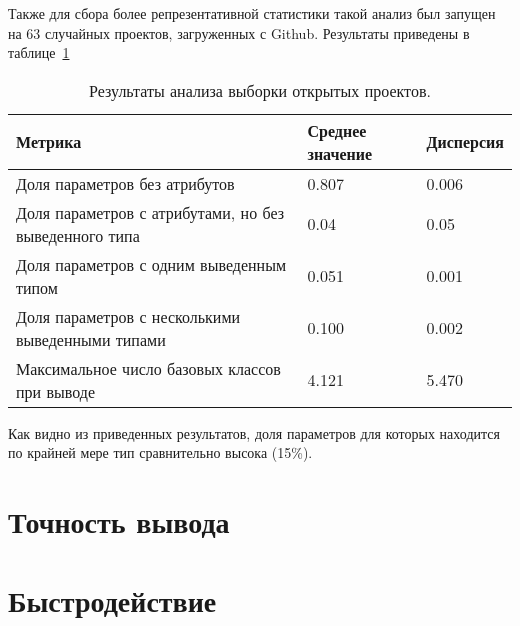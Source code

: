 Также для сбора более репрезентативной статистики такой анализ был запущен на 63
случайных проектов, загруженных с Github. Результаты приведены в
таблице~\ref{tab:statistics-results-2}

\begin{table}[H]
  \scriptsize
  \caption{Результаты анализа выборки открытых проектов.}
  \label{tab:statistics-results-2}
  \begin{tabularx}{\textwidth}{ |X|X|X| }
    \hline
    Метрика & Среднее значение & Дисперсия \\ \hline
    Доля параметров без атрибутов & 0.807 & 0.006 \\ \hline
    Доля параметров с атрибутами, но без выведенного типа & 0.04 & 0.05 \\ \hline
    Доля параметров с одним выведенным типом & 0.051 & 0.001 \\ \hline
    Доля параметров с несколькими выведенными типами & 0.100 & 0.002 \\ \hline
    Максимальное число базовых классов при выводе & 4.121 & 5.470 \\ \hline
  \end{tabularx}
\end{table}

Как видно из приведенных результатов, доля параметров для которых находится по крайней
мере тип сравнительно высока (15\%).

\section{Точность вывода}
\label{sec:inference-precision}

\section{Быстродействие}
\label{sec:inference-performance}
